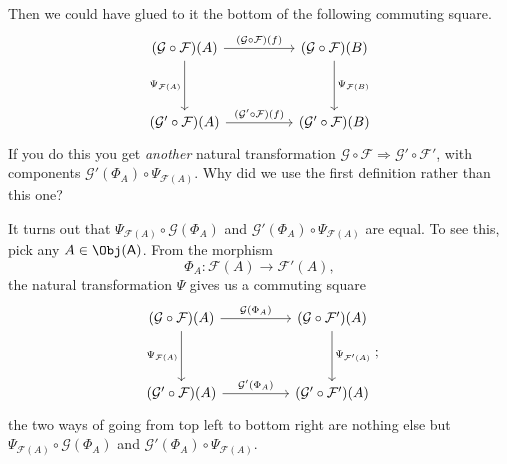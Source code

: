 \documentclass[main.tex]{subfiles}
\begin{document}
Then we could have glued to it the bottom of the following commuting square.
\begin{equation*}
  \begin{tikzcd}[row sep=huge, column sep=huge]
    (\mathcal{G} \circ \mathcal{F})(A)
    \arrow[r, "(\mathcal{G} \circ \mathcal{F})(f)"]
    \arrow[d, swap, "\Psi_{\mathcal{F}(A)}"]
    & (\mathcal{G} \circ \mathcal{F})(B)
    \arrow[d, "\Psi_{\mathcal{F}(B)}"]
    \\
    (\mathcal{G}' \circ \mathcal{F})(A)
    \arrow[r, "(\mathcal{G}' \circ \mathcal{F})(f)"]
    & (\mathcal{G}' \circ \mathcal{F})(B)
  \end{tikzcd}
\end{equation*}
If you do this you get \emph{another} natural transformation $\mathcal{G} \circ \mathcal{F} \Rightarrow \mathcal{G}' \circ \mathcal{F}'$, with components $\mathcal{G}'(\Phi_{A}) \circ \Psi_{\mathcal{F}(A)}$. Why did we use the first definition rather than this one?

It turns out that $\Psi_{\mathcal{F}(A)} \circ \mathcal{G}(\Phi_{A})$ and $\mathcal{G}'(\Phi_{A}) \circ \Psi_{\mathcal{F}(A)}$ are equal. To see this, pick any $A \in \Obj(\mathsf{A})$. From the morphism
\begin{equation*}
  \Phi_{A}\colon \mathcal{F}(A) \to \mathcal{F}'(A),
\end{equation*}
the natural transformation $\Psi$ gives us a commuting square
\begin{equation*}
  \begin{tikzcd}[row sep=huge, column sep=huge]
    (\mathcal{G} \circ \mathcal{F})(A)
    \arrow[r, "\mathcal{G}(\Phi_{A})"]
    \arrow[d, swap, "\Psi_{\mathcal{F}(A)}"]
    & (\mathcal{G} \circ \mathcal{F}')(A)
    \arrow[d, "\Psi_{\mathcal{F}'(A)}"]
    \\
    (\mathcal{G}' \circ \mathcal{F})(A)
    \arrow[r, "\mathcal{G}'(\Phi_{A})"]
    & (\mathcal{G}' \circ \mathcal{F}')(A)
  \end{tikzcd};
\end{equation*}
the two ways of going from top left to bottom right are nothing else but $\Psi_{\mathcal{F}(A)} \circ \mathcal{G}(\Phi_{A})$ and $\mathcal{G}'(\Phi_{A}) \circ \Psi_{\mathcal{F}(A)}$.
\end{document}
